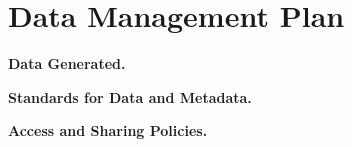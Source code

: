 \documentclass[11pt]{article}
\renewcommand{\paragraph}[1]{\smallskip\noindent\textbf{#1.}}
\begin{document}
\section*{Data Management Plan}




\paragraph{Data Generated}

\paragraph{Standards for Data and Metadata}

\paragraph{Access and Sharing Policies}
\end{document}
